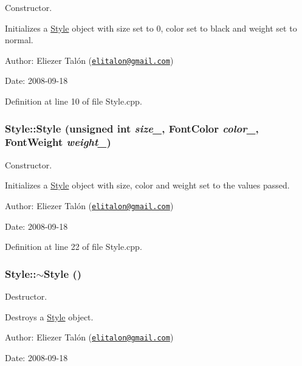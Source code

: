 Constructor. 

Initializes a \hyperlink{class_style}{Style} object with size set to 0, color set to black and weight set to normal.

\begin{Desc}
\item[Author:]Eliezer Talón (\href{mailto:elitalon@gmail.com}{\tt elitalon@gmail.com}) \end{Desc}
\begin{Desc}
\item[Date:]2008-09-18 \end{Desc}


Definition at line 10 of file Style.cpp.\hypertarget{class_style_1d6e412d4343b4a6eb4253b6456928b6}{
\subsubsection[Style]{\setlength{\rightskip}{0pt plus 5cm}Style::Style (unsigned int {\em size\_\-}, \/  {\bf FontColor} {\em color\_\-}, \/  {\bf FontWeight} {\em weight\_\-})}}
\label{class_style_1d6e412d4343b4a6eb4253b6456928b6}


Constructor. 

Initializes a \hyperlink{class_style}{Style} object with size, color and weight set to the values passed.

\begin{Desc}
\item[Author:]Eliezer Talón (\href{mailto:elitalon@gmail.com}{\tt elitalon@gmail.com}) \end{Desc}
\begin{Desc}
\item[Date:]2008-09-18 \end{Desc}


Definition at line 22 of file Style.cpp.\hypertarget{class_style_7c798ef9b77bc94719542feade497725}{
\subsubsection[$\sim$Style]{\setlength{\rightskip}{0pt plus 5cm}Style::$\sim$Style ()}}
\label{class_style_7c798ef9b77bc94719542feade497725}


Destructor. 

Destroys a \hyperlink{class_style}{Style} object.

\begin{Desc}
\item[Author:]Eliezer Talón (\href{mailto:elitalon@gmail.com}{\tt elitalon@gmail.com}) \end{Desc}
\begin{Desc}
\item[Date:]2008-09-18 \end{Desc}


